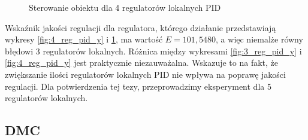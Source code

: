 \begin{figure}[H]
\centering
{}
\caption{Sterowanie obiektu dla 4 regulatorów lokalnych PID}
\label{fig:4_reg_pid_u}
\end{figure}

Wskaźnik jakości regulacji dla regulatora, którego działanie przedstawiają wykresy \ref{fig:4_reg_pid_y} i \ref{fig:4_reg_pid_u}, ma wartość $E=101,5480$, a więc niemalże równy błędowi 3 regulatorów lokalnych. Różnica między wykresami \ref{fig:3_reg_pid_y} i \ref{fig:4_reg_pid_y} jest praktycznie niezauważalna. Wskazuje to na fakt, że zwiększanie ilości regulatorów lokalnych PID nie wpływa na poprawę jakości regulacji. Dla potwierdzenia tej tezy, przeprowadzimy eksperyment dla 5 regulatorów lokalnych.
\subsection{DMC}